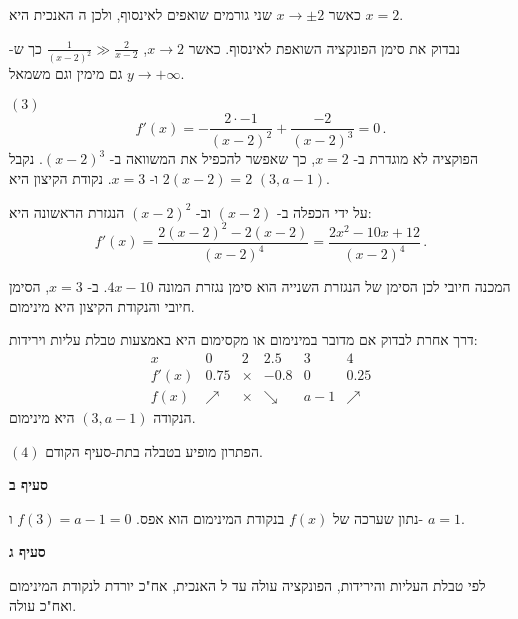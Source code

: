 כאשר 
$x\rightarrow \pm 2$
שני גורמים שואפים לאינסוף, ולכן ה%
\asm{}
האנכית היא
$x=2$.

נבדוק את סימן הפונקציה השואפת לאינסוף. כאשר
$x\rightarrow 2$,
$\frac{1}{(x-2)^2}\gg\frac{2}{x-2}$
כך ש-%
$y\rightarrow+\infty$
גם מימין וגם משמאל.

$(3)$
\[
f'(x) = -\frac{2\cdot -1}{(x-2)^2} + \frac{-2}{(x-2)^3}=0\,.
\]
הפוקציה לא מוגדרת ב-%
$x=2$,
כך שאפשר להכפיל את המשוואה ב-%
$(x-2)^3$.
נקבל
$2(x-2)=2$
ו-%
$x=3$.
נקודת הקיצון היא
$(3,a-1)$.

על ידי הכפלה ב-%
$(x-2)$
וב-%
$(x-2)^2$
הנגזרת הראשונה היא:
\[
f'(x) = \frac{2(x-2)^2-2(x-2)}{(x-2)^4}=\frac{2x^2-10x+12}{(x-2)^4}\,.
\]

\np

המכנה חיובי לכן הסימן של הנגזרת השנייה הוא סימן נגזרת המונה
$4x-10$.
ב-%
$x=3$,
הסימן חיובי והנקודת הקיצון היא מינימום.

דרך אחרת לבדוק אם מדובר במינימום או מקסימום היא באמצעות טבלת עליות וירידות:
\[
\begin{array}{c|c|c|c|c|c}
x & 0 & 2 & 2.5 & 3 & 4\\\hline
f'(x) & 0.75 & \times & -0.8& 0 & 0.25\\\hline
f(x) & \nearrow & \times & \searrow & a-1 & \nearrow
\end{array}
\]
הנקודה
$(3,a-1)$
היא מינימום.

$(4)$
הפתרון מופיע בטבלה בתת-סעיף הקודם.

\textbf{סעיף ב}

נתון שערכה של
$f(x)$
בנקודת המינימום הוא אפס.
$f(3)=a-1=0$
ו-%
$a=1$.

\textbf{סעיף ג}

לפי טבלת העליות והירידות, הפונקציה עולה עד ל%
\asm{}
האנכית, אח"כ יורדת לנקודת המינימום ואח"כ עולה.

\begin{center}
\end{center}


